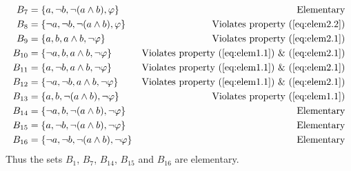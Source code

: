 \begin{example}
\begin{align*}
    B_7    &= \left\{ a,       \lnot b, \lnot (a\land b), \phi       \right\} &\text{Elementary} \\
    B_8    &= \left\{ \lnot a, \lnot b, \lnot (a\land b), \phi       \right\} &\text{Violates property (\ref{eq:elem2.2})} \\
    B_9    &= \left\{ a,       b,       a\land b,         \lnot \phi \right\} &\text{Violates property (\ref{eq:elem2.1})} \\
    B_{10} &= \left\{ \lnot a, b,       a\land b,         \lnot \phi \right\} &\text{Violates property (\ref{eq:elem1.1}) \& (\ref{eq:elem2.1})} \\
    B_{11} &= \left\{ a,       \lnot b, a\land b,         \lnot \phi \right\} &\text{Violates property (\ref{eq:elem1.1}) \& (\ref{eq:elem2.1})} \\
    B_{12} &= \left\{ \lnot a, \lnot b, a\land b,         \lnot \phi \right\} &\text{Violates property (\ref{eq:elem1.1}) \& (\ref{eq:elem2.1})} \\
    B_{13} &= \left\{ a,       b,       \lnot (a\land b), \lnot \phi \right\} &\text{Violates property (\ref{eq:elem1.1})} \\
    B_{14} &= \left\{ \lnot a, b,       \lnot (a\land b), \lnot \phi \right\} &\text{Elementary} \\
    B_{15} &= \left\{ a,       \lnot b, \lnot (a\land b), \lnot \phi \right\} &\text{Elementary} \\
    B_{16} &= \left\{ \lnot a, \lnot b, \lnot (a\land b), \lnot \phi \right\} &\text{Elementary} 
\end{align*}
Thus the sets $B_1$, $B_7$, $B_{14}$, $B_{15}$ and $B_{16}$ are elementary.
\end{example}